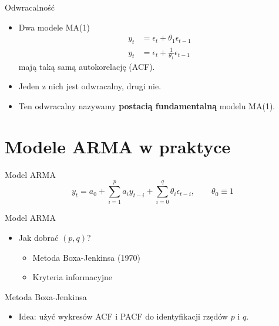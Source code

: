 \documentclass[11pt,usenames,dvipsnames,aspectratio=169]{beamer}
\begin{document}
\begin{frame}{Odwracalność}
\begin{itemize}
    \item Dwa modele MA(1)
    \begin{align*}
    y_{t} & =\epsilon_{t}+\theta_{1}\epsilon_{t-1}\\
    y_{t} & =\epsilon_{t}+\tfrac{1}{\theta_{1}}\epsilon_{t-1}
    \end{align*}
    mają taką samą autokorelację (ACF).
    \item Jeden z nich jest odwracalny, drugi nie.
    \item Ten odwracalny nazywamy \textbf{postacią fundamentalną} modelu MA(1).
\end{itemize}
\end{frame}

\section{Modele ARMA w praktyce}

\begin{frame}{Model ARMA}
\[
y_{t}=a_{0}+\sum_{i=1}^{p}a_{i}y_{t-i}+\sum_{i=0}^{q}\theta_{i}\epsilon_{t-i}, \qquad \theta_{0}\equiv 1
\]
\end{frame}

\begin{frame}{Model ARMA}
\begin{itemize}
    \item Jak dobrać $(p,q)$?
    \begin{itemize}
        \item Metoda Boxa-Jenkinsa (1970)
        \item Kryteria informacyjne
    \end{itemize}
\end{itemize}
\end{frame}

\begin{frame}{Metoda Boxa-Jenkinsa}
\begin{itemize}
    \item Idea: użyć wykresów ACF i PACF do identyfikacji rzędów $p$ i $q$.
\end{itemize}
\end{frame}
\end{document}
